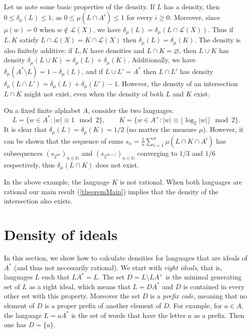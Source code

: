 \documentclass[a4paper,UKenglish,numberwithinsect,cleveref]{lipics-v2021}
\newcommand{\N}{\mathbb{N}}
\newcommand{\cL}{\mathcal L}
\begin{document}
Let us note some basic properties of the density. If $L$ has a density, then  $0\le \delta_\mu(L)\le 1$, as $0\le\mu(L\cap A^i)\le 1$ for every $i\ge 0$. Moreover, since $\mu(w)=0$ when $w\notin\cL(X)$, we have $\delta_\mu(L)=\delta_\mu(L\cap\cL(X))$. Thus if $L,K$ satisfy $L\cap\cL(X)=K\cap\cL(X)$ then $\delta_\mu(L)=\delta_\mu(K)$. The density is also finitely additive: if $L,K$ have densities and $L\cap K=\varnothing$, then $L\cup K$ has density $\delta_\mu(L\cup K)=\delta_\mu(L)+\delta_\mu(K)$. Additionally, we have $\delta_\mu(A^*\setminus L)=1-\delta_\mu(L)$, and if $L\cup L'=A^*$ then $L\cap L'$ has density $\delta_\mu(L\cap L') = \delta_\mu(L)+\delta_\mu(L')-1$. However, the density of an intersection $L\cap K$ might not exist, even when the density of both $L$ and $K$ exist.
\begin{example}
    On a fixed finite alphabet $A$, consider the two languages:
    \begin{equation*}
        L = \{ w\in A^* : |w| \equiv 1 \mod 2 \},\qquad K = \{ w\in A^+ : |w|\equiv \lfloor\log_2|w|\rfloor \mod 2 \}.
    \end{equation*}
    It is clear that $\delta_\mu(L)=\delta_\mu(K)=1/2$ (no matter the measure $\mu$). However, it can be shown that the sequence of sums $s_n = \frac1{n}\sum_{i=1}^{n}\mu(L\cap K\cap A^i)$ has subsequences $(s_{2^{2n}})_{n\in\N}$ and $(s_{2^{2n+1}})_{n\in\N}$ converging to $1/3$ and $1/6$ respectively, thus $\delta_\mu(L\cap K)$ does not exist.
\end{example}

In the above example, the language $K$ is not rational. When both languages are rational our main result (\cref{theoremMain}) implies that the density of the intersection also exists.

\section{Density of ideals} 
\label{sec:idealsfullmonoid}

In this section, we show how to calculate densities for languages that are  ideals of $A^*$ (and thus not necessarily rational). We start with {\em right ideals}, that is, languages $L$ such that $LA^*=L$. The set $D=L\setminus L A^+$ is the  minimal generating set of $L$ as a right ideal, which means that $L= DA^*$ and $D$ is contained in every other set with this property. Moreover the set $D$ is a \emph{prefix code}, meaning that no element of $D$ is a proper prefix of another element of $D$. For example, for $a\in A$, the language $L= aA^*$ is the set of words  that have the letter $a$ as a prefix. Then one has $D=\{a\}$.
\end{document}
